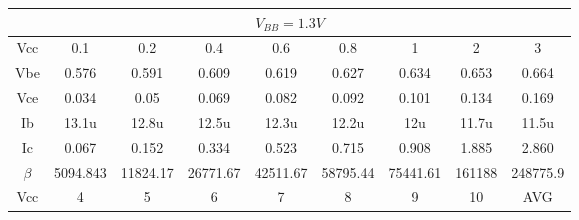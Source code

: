 \begin{table}[h]
\centering
\begin{tabular}{|ccccccccc|}
\hline
\multicolumn{9}{|c|}{$V_{BB}=1.3V$}                                                                                                                                                                                                                                      \\ \hline
\multicolumn{1}{|c|}{Vcc}     & \multicolumn{1}{c|}{0.1}      & \multicolumn{1}{c|}{0.2}      & \multicolumn{1}{c|}{0.4}      & \multicolumn{1}{c|}{0.6}      & \multicolumn{1}{c|}{0.8}      & \multicolumn{1}{c|}{1}        & \multicolumn{1}{c|}{2}        & 3        \\ \hline
\multicolumn{1}{|c|}{Vbe}     & \multicolumn{1}{c|}{0.576}    & \multicolumn{1}{c|}{0.591}    & \multicolumn{1}{c|}{0.609}    & \multicolumn{1}{c|}{0.619}    & \multicolumn{1}{c|}{0.627}    & \multicolumn{1}{c|}{0.634}    & \multicolumn{1}{c|}{0.653}    & 0.664    \\ \hline
\multicolumn{1}{|c|}{Vce}     & \multicolumn{1}{c|}{0.034}    & \multicolumn{1}{c|}{0.05}     & \multicolumn{1}{c|}{0.069}    & \multicolumn{1}{c|}{0.082}    & \multicolumn{1}{c|}{0.092}    & \multicolumn{1}{c|}{0.101}    & \multicolumn{1}{c|}{0.134}    & 0.169    \\ \hline
\multicolumn{1}{|c|}{Ib}      & \multicolumn{1}{c|}{13.1u}    & \multicolumn{1}{c|}{12.8u}    & \multicolumn{1}{c|}{12.5u}    & \multicolumn{1}{c|}{12.3u}    & \multicolumn{1}{c|}{12.2u}    & \multicolumn{1}{c|}{12u}      & \multicolumn{1}{c|}{11.7u}    & 11.5u    \\ \hline
\multicolumn{1}{|c|}{Ic}      & \multicolumn{1}{c|}{0.067}    & \multicolumn{1}{c|}{0.152}    & \multicolumn{1}{c|}{0.334}    & \multicolumn{1}{c|}{0.523}    & \multicolumn{1}{c|}{0.715}    & \multicolumn{1}{c|}{0.908}    & \multicolumn{1}{c|}{1.885}    & 2.860    \\ \hline
\multicolumn{1}{|c|}{$\beta$} & \multicolumn{1}{c|}{5094.843} & \multicolumn{1}{c|}{11824.17} & \multicolumn{1}{c|}{26771.67} & \multicolumn{1}{c|}{42511.67} & \multicolumn{1}{c|}{58795.44} & \multicolumn{1}{c|}{75441.61} & \multicolumn{1}{c|}{161188}   & 248775.9 \\ \hline
\multicolumn{1}{|c|}{Vcc}     & \multicolumn{1}{c|}{4}        & \multicolumn{1}{c|}{5}        & \multicolumn{1}{c|}{6}        & \multicolumn{1}{c|}{7}        & \multicolumn{1}{c|}{8}        & \multicolumn{1}{c|}{9}        & \multicolumn{1}{c|}{10}       & AVG      \\ \hline

\end{tabular}
\end{table}
